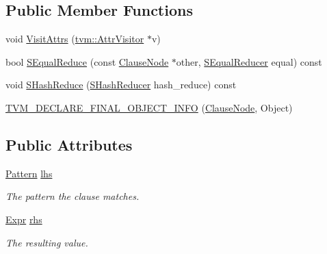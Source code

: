 \subsection*{Public Member Functions}
\begin{DoxyCompactItemize}
\item 
void \hyperlink{classtvm_1_1relay_1_1ClauseNode_ac73f65e5e9187d74aaa0a47c45cb6eb8}{Visit\+Attrs} (\hyperlink{classtvm_1_1AttrVisitor}{tvm\+::\+Attr\+Visitor} $\ast$v)
\item 
bool \hyperlink{classtvm_1_1relay_1_1ClauseNode_a12619fb0cfd53715042eb246d317f322}{S\+Equal\+Reduce} (const \hyperlink{classtvm_1_1relay_1_1ClauseNode}{Clause\+Node} $\ast$other, \hyperlink{classtvm_1_1SEqualReducer}{S\+Equal\+Reducer} equal) const 
\item 
void \hyperlink{classtvm_1_1relay_1_1ClauseNode_a11ee5813780b53099365c703347c7063}{S\+Hash\+Reduce} (\hyperlink{classtvm_1_1SHashReducer}{S\+Hash\+Reducer} hash\+\_\+reduce) const 
\item 
\hyperlink{classtvm_1_1relay_1_1ClauseNode_a7f54bbb74724dcd6040a2271a52ba3c5}{T\+V\+M\+\_\+\+D\+E\+C\+L\+A\+R\+E\+\_\+\+F\+I\+N\+A\+L\+\_\+\+O\+B\+J\+E\+C\+T\+\_\+\+I\+N\+FO} (\hyperlink{classtvm_1_1relay_1_1ClauseNode}{Clause\+Node}, Object)
\end{DoxyCompactItemize}
\subsection*{Public Attributes}
\begin{DoxyCompactItemize}
\item 
\hyperlink{classtvm_1_1relay_1_1Pattern}{Pattern} \hyperlink{classtvm_1_1relay_1_1ClauseNode_a85479b56eab2bb3255248a8b0fcd23f8}{lhs}
\begin{DoxyCompactList}\small\item\em The pattern the clause matches. \end{DoxyCompactList}\item 
\hyperlink{namespacetvm_1_1relay_a5b84e3790f89bb3fad5c7911eeb99531}{Expr} \hyperlink{classtvm_1_1relay_1_1ClauseNode_a93217eeea15c1f7c1a659da3da86d3bd}{rhs}
\begin{DoxyCompactList}\small\item\em The resulting value. \end{DoxyCompactList}\end{DoxyCompactItemize}
